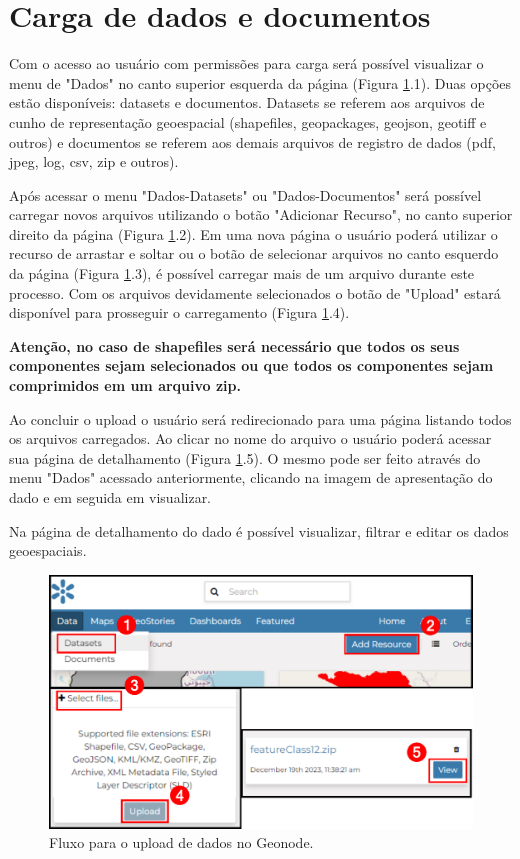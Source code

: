 \documentclass[12pt]{article}
\begin{document}
\section{Carga de dados e documentos}

Com o acesso ao usuário com permissões para carga será possível visualizar o
menu de "Dados" no canto superior esquerda da página (Figura
\ref{fig:upload}.1). Duas opções estão disponíveis: datasets e documentos.
Datasets se referem aos arquivos de cunho de representação geoespacial
(shapefiles, geopackages, geojson, geotiff e outros) e documentos se referem
aos demais arquivos de registro de dados (pdf, jpeg, log, csv, zip e outros).

Após acessar o menu "Dados-Datasets" ou "Dados-Documentos" será possível
carregar novos arquivos utilizando o botão "Adicionar Recurso", no canto
superior direito da página (Figura \ref{fig:upload}.2). Em uma nova página o
usuário poderá utilizar o recurso de arrastar e soltar ou o botão de selecionar
arquivos no canto esquerdo da página (Figura \ref{fig:upload}.3), é possível
carregar mais de um arquivo durante este processo. Com os arquivos devidamente
selecionados o botão de "Upload" estará disponível para prosseguir o
carregamento (Figura \ref{fig:upload}.4). 

\textbf{Atenção, no caso de shapefiles será necessário que todos os seus
componentes sejam selecionados ou que todos os componentes sejam comprimidos em
um arquivo zip.}

Ao concluir o upload o usuário será redirecionado para uma página listando
todos os arquivos carregados. Ao clicar no nome do arquivo o usuário poderá
acessar sua página de detalhamento (Figura \ref{fig:upload}.5). O mesmo pode
ser feito através do menu "Dados" acessado anteriormente, clicando na imagem de
apresentação do dado e em seguida em visualizar.

Na página de detalhamento do dado é possível visualizar, filtrar e editar os
dados geoespaciais.

\begin{figure}[ht]
  \centering
  \includegraphics[width=\textwidth, keepaspectratio]{img/upload.pdf}
  \caption{Fluxo para o upload de dados no Geonode.}
  \label{fig:upload}
\end{figure}
\end{document}
